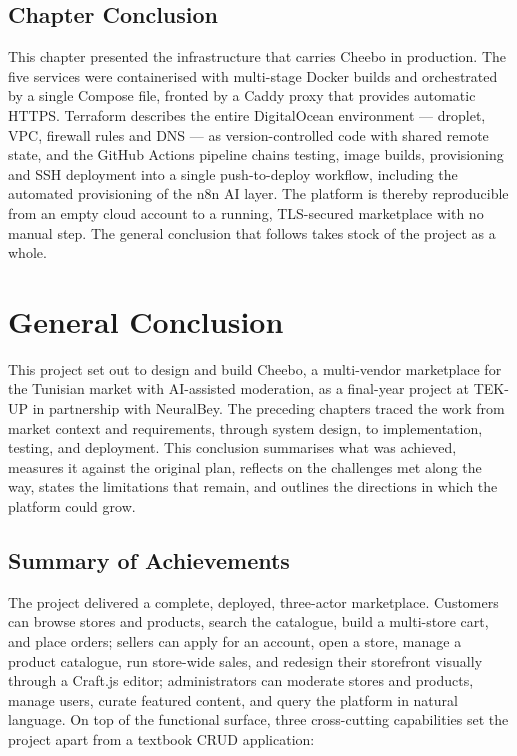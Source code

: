\documentclass[12pt, a4paper, oneside]{report}
\begin{document}
\section*{Chapter Conclusion}

This chapter presented the infrastructure that carries Cheebo in
production. The five services were containerised with multi-stage
Docker builds and orchestrated by a single Compose file, fronted by
a Caddy proxy that provides automatic HTTPS. Terraform describes the
entire DigitalOcean environment --- droplet, VPC, firewall rules and
DNS --- as version-controlled code with shared remote state, and the
GitHub Actions pipeline chains testing, image builds, provisioning
and SSH deployment into a single push-to-deploy workflow, including
the automated provisioning of the n8n AI layer. The platform is
thereby reproducible from an empty cloud account to a running,
TLS-secured marketplace with no manual step. The general conclusion
that follows takes stock of the project as a whole.

\chapter*{General Conclusion}

This project set out to design and build Cheebo, a multi-vendor
marketplace for the Tunisian market with AI-assisted moderation, as a
final-year project at TEK-UP in partnership with NeuralBey. The
preceding chapters traced the work from market context and
requirements, through system design, to implementation, testing, and
deployment. This conclusion summarises what was achieved, measures it
against the original plan, reflects on the challenges met along the
way, states the limitations that remain, and outlines the directions
in which the platform could grow.

\section*{Summary of Achievements}

The project delivered a complete, deployed, three-actor marketplace.
Customers can browse stores and products, search the catalogue, build
a multi-store cart, and place orders; sellers can apply for an
account, open a store, manage a product catalogue, run store-wide
sales, and redesign their storefront visually through a Craft.js
editor; administrators can moderate stores and products, manage users,
curate featured content, and query the platform in natural language.
On top of the functional surface, three cross-cutting capabilities set
the project apart from a textbook CRUD application:
\end{document}
